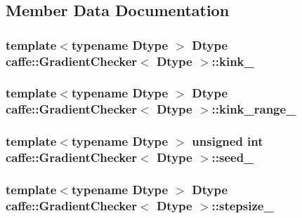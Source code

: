 \subsection{Member Data Documentation}
\hypertarget{classcaffe_1_1_gradient_checker_af6511d07455bbacdd61e79c33c13fbc9}{
\subsubsection[{kink\+\_\+}]{\setlength{\rightskip}{0pt plus 5cm}template$<$typename Dtype $>$ Dtype {\bf caffe\+::\+Gradient\+Checker}$<$ Dtype $>$\+::kink\+\_\+\hspace{0.3cm}{\ttfamily [protected]}}}\label{classcaffe_1_1_gradient_checker_af6511d07455bbacdd61e79c33c13fbc9}
\hypertarget{classcaffe_1_1_gradient_checker_a827262b9c3ebcc0f20f9d135541a6c49}{
\subsubsection[{kink\+\_\+range\+\_\+}]{\setlength{\rightskip}{0pt plus 5cm}template$<$typename Dtype $>$ Dtype {\bf caffe\+::\+Gradient\+Checker}$<$ Dtype $>$\+::kink\+\_\+range\+\_\+\hspace{0.3cm}{\ttfamily [protected]}}}\label{classcaffe_1_1_gradient_checker_a827262b9c3ebcc0f20f9d135541a6c49}
\hypertarget{classcaffe_1_1_gradient_checker_a2b5ddbc782ecee24eacf4e567e4bd954}{
\subsubsection[{seed\+\_\+}]{\setlength{\rightskip}{0pt plus 5cm}template$<$typename Dtype $>$ unsigned int {\bf caffe\+::\+Gradient\+Checker}$<$ Dtype $>$\+::seed\+\_\+\hspace{0.3cm}{\ttfamily [protected]}}}\label{classcaffe_1_1_gradient_checker_a2b5ddbc782ecee24eacf4e567e4bd954}
\hypertarget{classcaffe_1_1_gradient_checker_aaa427369839646baa465b09ead4ba5e7}{
\subsubsection[{stepsize\+\_\+}]{\setlength{\rightskip}{0pt plus 5cm}template$<$typename Dtype $>$ Dtype {\bf caffe\+::\+Gradient\+Checker}$<$ Dtype $>$\+::stepsize\+\_\+\hspace{0.3cm}{\ttfamily [protected]}}}\label{classcaffe_1_1_gradient_checker_aaa427369839646baa465b09ead4ba5e7}
